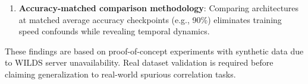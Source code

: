 \begin{enumerate}
\item \textbf{Accuracy-matched comparison methodology}: Comparing architectures at matched average accuracy checkpoints (e.g., 90\%) eliminates training speed confounds while revealing temporal dynamics.
\end{enumerate}

These findings are based on proof-of-concept experiments with synthetic data due to WILDS server unavailability. Real dataset validation is required before claiming generalization to real-world spurious correlation tasks.
